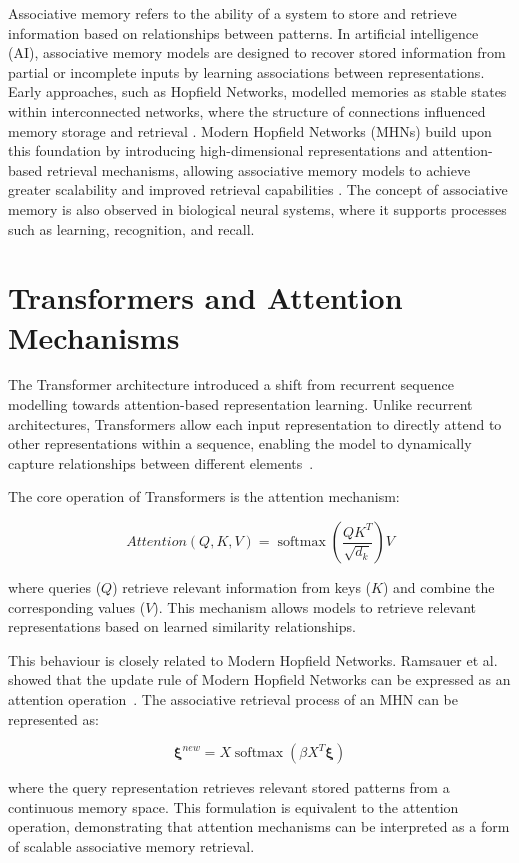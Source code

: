 Associative memory refers to the ability of a system to store and retrieve information based on relationships between patterns. In artificial intelligence (AI), associative memory models are designed to recover stored information from partial or incomplete inputs by learning associations between representations. Early approaches, such as Hopfield Networks, modelled memories as stable states within interconnected networks, where the structure of connections influenced memory storage and retrieval \cite{hopfield1982}. Modern Hopfield Networks (MHNs) build upon this foundation by introducing high-dimensional representations and attention-based retrieval mechanisms, allowing associative memory models to achieve greater scalability and improved retrieval capabilities \cite{ramsauer2021hopfield}. The concept of associative memory is also observed in biological neural systems, where it supports processes such as learning, recognition, and recall.

\section{Transformers and Attention Mechanisms}

The Transformer architecture introduced a shift from recurrent sequence modelling
towards attention-based representation learning. Unlike recurrent architectures,
Transformers allow each input representation to directly attend to other
representations within a sequence, enabling the model to dynamically capture
relationships between different elements~\cite{vaswani2017attention}.

The core operation of Transformers is the attention mechanism:

\[
Attention(Q,K,V)=
\operatorname{softmax}
\left(
\frac{QK^T}{\sqrt{d_k}}
\right)V
\]

where queries ($Q$) retrieve relevant information from keys ($K$) and combine
the corresponding values ($V$). This mechanism allows models to retrieve
relevant representations based on learned similarity relationships.

This behaviour is closely related to Modern Hopfield Networks. Ramsauer et al.
showed that the update rule of Modern Hopfield Networks can be expressed as an
attention operation~\cite{ramsauer2021hopfield}. The associative retrieval
process of an MHN can be represented as:

\[
\boldsymbol{\xi}^{new}
=
X\operatorname{softmax}
(\beta X^T\boldsymbol{\xi})
\]

where the query representation retrieves relevant stored patterns from a
continuous memory space. This formulation is equivalent to the attention
operation, demonstrating that attention mechanisms can be interpreted as a form
of scalable associative memory retrieval.


